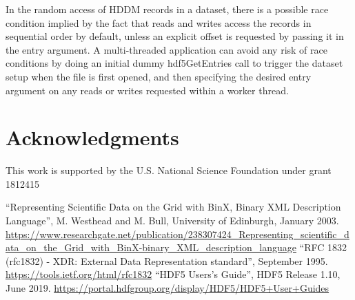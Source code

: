\documentclass{revtex4}
\begin{document}
In the random access of HDDM records in a dataset, there is a
possible race condition implied by the fact that reads and writes access the
records in sequential order by default, unless an explicit offset is requested
by passing it in the entry argument. A multi-threaded application can avoid any
risk of race conditions by doing an initial dummy hdf5GetEntries call to 
trigger the dataset setup when the file is first opened, and then specifying
the desired entry argument on any reads or writes requested within a worker thread.

\section*{Acknowledgments}

This work is supported by the U.S. National Science Foundation under grant 1812415

\begin{thebibliography}{d}
``Representing Scientific Data on the Grid with BinX, Binary XML Description
Language'', M. Westhead and M. Bull, University of Edinburgh, January 2003.
\url{https://www.researchgate.net/publication/238307424_Representing_scientific_data_on_the_Grid_with_BinX-binary_XML_description_language}
``RFC 1832 (rfc1832) - XDR: External Data Representation standard'',
September 1995.
\url{https://tools.ietf.org/html/rfc1832}
``HDF5 Users's Guide'', HDF5 Release 1.10, June 2019.
\url{https://portal.hdfgroup.org/display/HDF5/HDF5+User+Guides}
\end{thebibliography}
\end{document}
